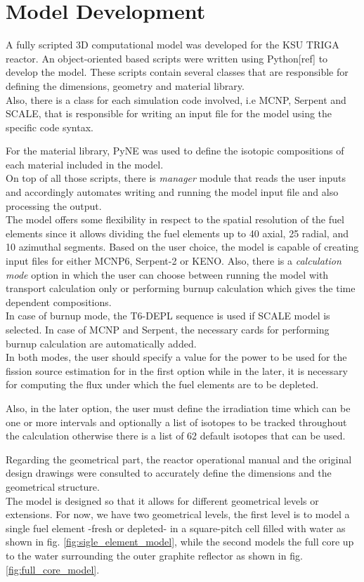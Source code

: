 \documentclass[review,number,sort&compress,12pt]{elsarticle}
\begin{document}
\section{Model Development}

A fully scripted 3D computational model was developed for the KSU TRIGA reactor. An object-oriented based scripts were written using Python[ref] to develop the model. These scripts contain several classes that are responsible for defining the dimensions, geometry and material library. \\
Also, there is a class for each simulation code involved, i.e MCNP, Serpent and SCALE, that is responsible for writing an input file for the model using the specific code syntax.

For the material library, PyNE \cite{bates2014pyne} was used to define the isotopic compositions of each material included in the model.\\
On top of all those scripts, there is \emph{manager} module that reads the user inputs and accordingly automates writing and running the model input file and also processing the output.\\
The model offers some flexibility in respect to the spatial resolution of the fuel elements since it allows dividing the fuel elements up to 40 axial, 25 radial, and 10 azimuthal segments.
Based on the user choice, the model is capable of creating input files for either MCNP6, Serpent-2 or KENO. Also, there is a \emph{calculation mode} option in which the user can choose between running the model with transport calculation only or performing burnup calculation which gives the time dependent compositions.\\
In case of burnup mode, the T6-DEPL sequence is used if SCALE model is selected. In case of MCNP and Serpent, the necessary cards for performing burnup calculation are automatically added. \\
In both modes, the user should specify a value for the power to be used for the fission source estimation for in the first option while in the later, it is necessary for computing the flux under which the fuel elements are to be depleted.

Also, in the later option, the user must define the irradiation time which can be one or more intervals and optionally a list of isotopes to be tracked throughout the calculation otherwise there is a list of 62 default isotopes that can be used.

Regarding the geometrical part, the reactor operational manual and the original design drawings were consulted to accurately define the dimensions and the geometrical structure.\\  The model is designed so that it allows for different geometrical levels or extensions. For now, we have two geometrical levels, the first level is to model a single fuel element -fresh or depleted- in a square-pitch cell filled with water as shown in fig. \ref{fig:sigle_element_model}, while the second models the full core up to the water surrounding the outer graphite reflector as shown in fig.\ref{fig:full_core_model}.
\end{document}
